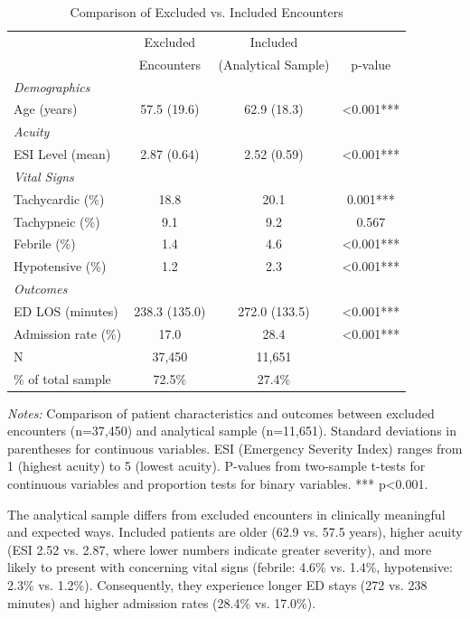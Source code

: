 \documentclass[11pt]{article}
\newcommand{\1}{\hbox{\rm 1\kern-.35em 1}}
\begin{document}
\begin{table}[H]
\centering
\caption*{Comparison of Excluded vs. Included Encounters}
\begin{threeparttable}
\begin{tabular}{lccc}
\toprule
& Excluded & Included & \\
& Encounters & (Analytical Sample) & p-value \\
\midrule
\textit{Demographics} \\
Age (years) & 57.5 (19.6) & 62.9 (18.3) & <0.001*** \\
\midrule
\textit{Acuity} \\
ESI Level (mean) & 2.87 (0.64) & 2.52 (0.59) & <0.001*** \\
\midrule
\textit{Vital Signs} \\
Tachycardic (\%) & 18.8 & 20.1 & 0.001*** \\
Tachypneic (\%) & 9.1 & 9.2 & 0.567 \\
Febrile (\%) & 1.4 & 4.6 & <0.001*** \\
Hypotensive (\%) & 1.2 & 2.3 & <0.001*** \\
\midrule
\textit{Outcomes} \\
ED LOS (minutes) & 238.3 (135.0) & 272.0 (133.5) & <0.001*** \\
Admission rate (\%) & 17.0 & 28.4 & <0.001*** \\
\midrule
N & 37,450 & 11,651 & \\
\% of total sample & 72.5\% & 27.4\% & \\
\bottomrule
\end{tabular}
\begin{tablenotes}
\footnotesize
\item \textit{Notes:} Comparison of patient characteristics and outcomes between excluded encounters (n=37,450) and analytical sample (n=11,651). Standard deviations in parentheses for continuous variables. ESI (Emergency Severity Index) ranges from 1 (highest acuity) to 5 (lowest acuity). P-values from two-sample t-tests for continuous variables and proportion tests for binary variables. *** p<0.001.
\end{tablenotes}
\end{threeparttable}
\end{table}

The analytical sample differs from excluded encounters in clinically meaningful and expected ways. Included patients are older (62.9 vs. 57.5 years), higher acuity (ESI 2.52 vs. 2.87, where lower numbers indicate greater severity), and more likely to present with concerning vital signs (febrile: 4.6\% vs. 1.4\%, hypotensive: 2.3\% vs. 1.2\%). Consequently, they experience longer ED stays (272 vs. 238 minutes) and higher admission rates (28.4\% vs. 17.0\%).
\end{document}
